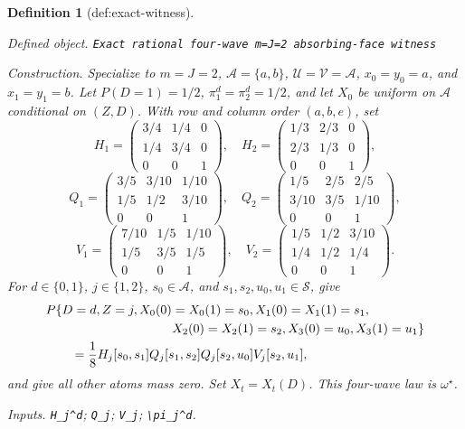 \documentclass{article}
\newtheorem{definition}{Definition}
\begin{document}
\begin{definition}[def:exact-witness]\label{def:exact-witness}
\par\smallskip\noindent\emph{Defined object.} \texttt{Exact rational four-\allowbreak{}wave m=\allowbreak{}J=\allowbreak{}2 absorbing-\allowbreak{}face witness}
\par\smallskip\noindent\emph{Construction.} Specialize to \(m=J=2\), \(\mathcal A=\{a,b\}\), \(\mathcal U=\mathcal V=\mathcal A\), \(x_0=y_0=a\), and \(x_1=y_1=b\). Let \(P(D=1)=1/2\), \(\pi_1^d=\pi_2^d=1/2\), and let \(X_0\) be uniform on \(\mathcal A\) conditional on \((Z,D)\). With row and column order \((a,b,e)\), set
\[
H_1=\begin{pmatrix}3/4&1/4&0\\1/4&3/4&0\\0&0&1\end{pmatrix},\quad
H_2=\begin{pmatrix}1/3&2/3&0\\2/3&1/3&0\\0&0&1\end{pmatrix},
\]
\[
Q_1=\begin{pmatrix}3/5&3/10&1/10\\1/5&1/2&3/10\\0&0&1\end{pmatrix},\quad
Q_2=\begin{pmatrix}1/5&2/5&2/5\\3/10&3/5&1/10\\0&0&1\end{pmatrix},
\]
\[
V_1=\begin{pmatrix}7/10&1/5&1/10\\1/5&3/5&1/5\\0&0&1\end{pmatrix},\quad
V_2=\begin{pmatrix}1/5&1/2&3/10\\1/4&1/2&1/4\\0&0&1\end{pmatrix}.
\]
For \(d\in\{0,1\}\), \(j\in\{1,2\}\), \(s_0\in\mathcal A\), and \(s_1,s_2,u_0,u_1\in\mathcal S\), give
\[
\begin{aligned}
&P\{D=d,Z=j,X_0(0)=X_0(1)=s_0,X_1(0)=X_1(1)=s_1,\\
&\hspace{35mm}X_2(0)=X_2(1)=s_2,X_3(0)=u_0,X_3(1)=u_1\}\\
&\qquad=\frac18H_j[s_0,s_1]Q_j[s_1,s_2]Q_j[s_2,u_0]V_j[s_2,u_1],
\end{aligned}
\]
and give all other atoms mass zero. Set \(X_t=X_t(D)\). This four-wave law is \(\omega^\star\).
\par\smallskip\noindent\emph{Inputs.} \texttt{H\_\allowbreak{}j\textasciicircum{}d}; \texttt{Q\_\allowbreak{}j}; \texttt{V\_\allowbreak{}j}; \texttt{\textbackslash{}\allowbreak{}pi\_\allowbreak{}j\textasciicircum{}d}.
\end{definition}
\end{document}
